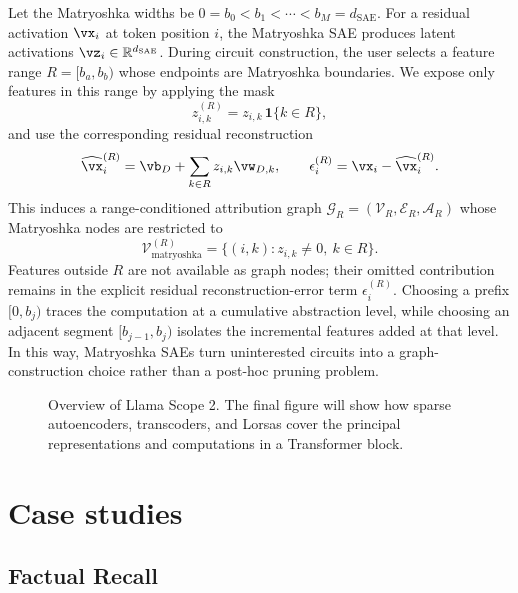 \documentclass{article}
\begin{document}
Let the Matryoshka widths be
$0=b_0<b_1<\cdots<b_M=d_{\mathrm{SAE}}$. For a residual activation
$\vx_i$ at token position $i$, the Matryoshka SAE produces latent activations
$\vz_i\in\mathbb{R}^{d_{\mathrm{SAE}}}$. During circuit construction, the user
selects a feature range $R=[b_a,b_b)$ whose endpoints are Matryoshka
boundaries. We expose only features in this range by applying the mask
\begin{equation}
    z^{(R)}_{i,k}
    =
    z_{i,k}\,\mathbf{1}\{k\in R\},
    \label{eq:matryoshka_range_mask}
\end{equation}
and use the corresponding residual reconstruction
\begin{equation}
    \widehat{\vx}^{(R)}_i
    =
    \vb_D
    +
    \sum_{k\in R} z_{i,k}\vw_{D,k},
    \qquad
    \epsilon^{(R)}_i
    =
    \vx_i-\widehat{\vx}^{(R)}_i .
    \label{eq:matryoshka_range_reconstruction}
\end{equation}
This induces a range-conditioned attribution graph
$\mathcal{G}_R=(\mathcal{V}_R,\mathcal{E}_R,\mathcal{A}_R)$ whose Matryoshka
nodes are restricted to
\begin{equation}
    \mathcal{V}^{(R)}_{\mathrm{matryoshka}}
    =
    \{(i,k): z_{i,k}\neq 0,\ k\in R\}.
    \label{eq:matryoshka_range_nodes}
\end{equation}
Features outside $R$ are not available as graph nodes; their omitted
contribution remains in the explicit residual reconstruction-error term
$\epsilon^{(R)}_i$. Choosing a prefix $[0,b_j)$ traces the computation at a
cumulative abstraction level, while choosing an adjacent segment
$[b_{j-1},b_j)$ isolates the incremental features added at that level. In this
way, Matryoshka SAEs turn uninterested circuits into a graph-construction
choice rather than a post-hoc pruning problem.

\begin{figure}[t]
    \centering
    \fbox{\rule{0pt}{1.6in}\rule{0.92\linewidth}{0pt}}
    \caption{Overview of Llama Scope 2. The final figure will show how sparse
    autoencoders, transcoders, and Lorsas cover the principal representations
    and computations in a Transformer block.}
    \label{fig:overview}
\end{figure}

\section{Case studies}
\label{sec:case_studies}

\subsection{Factual Recall}
\end{document}
